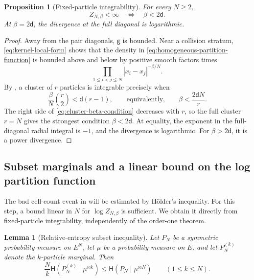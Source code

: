 \documentclass[11pt,reqno]{amsart}
\numberwithin{equation}{section}
\theoremstyle{plain}
\newtheorem{prop}[prop]{Proposition}
\newtheorem{lemma}[lemma]{Lemma}
\theoremstyle{definition}
\renewcommand{\d}{\mathsf d}
\newcommand{\be}{\beta}
\newcommand{\g}{\mathsf g}
\newcommand{\Hr}{\mathsf H}
\begin{document}
\begin{prop}[Fixed-particle integrability]
\label{prop:fixed-particle-integrability}
For every $N\geq2$,
\begin{equation}
 Z_{N,\be}<\infty
 \quad\Longleftrightarrow\quad
 \be<2\d.
 \label{eq:fixed-particle-threshold}
\end{equation}
At $\be=2\d$, the divergence at the full diagonal is logarithmic.
\end{prop}

\begin{proof}
Away from the pair diagonals, $\g$ is bounded.  Near a collision stratum, \eqref{eq:kernel-local-form} shows that the density in \eqref{eq:homogeneous-partition-function} is bounded above and below by positive smooth factors times
\begin{equation}
 \prod_{1\leq i<j\leq N}|x_i-x_j|^{-\be/N}.
 \label{eq:partition-collision-product}
\end{equation}
By , a cluster of $r$ particles is integrable precisely when
\begin{equation}
 \frac{\be}{N}\binom r2<\d(r-1),
 \qquad\text{equivalently,}\qquad
 \be<\frac{2\d N}{r}.
 \label{eq:cluster-beta-condition}
\end{equation}
The right side of \eqref{eq:cluster-beta-condition} decreases with $r$, so the full cluster $r=N$ gives the strongest condition $\be<2\d$.  At equality, the exponent in the full-diagonal radial integral is $-1$, and the divergence is logarithmic.  For $\be>2\d$, it is a power divergence.
\end{proof}

\subsection{Subset marginals and a linear bound on the log partition function}
\label{subsec:linear-safety}

The bad cell-count event in  will be estimated by H\"older's inequality. For this step, a bound linear in $N$ for $\log Z_{N,\be}$ is sufficient. We obtain it directly from fixed-particle integrability, independently of the order-one theorem.

\begin{lemma}[Relative-entropy subset inequality]
\label{lem:relative-entropy-subset}
Let $P_N$ be a symmetric probability measure on $E^N$, let $\mu$ be a probability measure on $E$, and let $P_N^{(k)}$ denote the $k$-particle marginal.  Then
\begin{equation}
 \frac Nk\Hr(P_N^{(k)}\mid\mu^{\otimes k})
 \leq\Hr(P_N\mid\mu^{\otimes N})
 \qquad(1\leq k\leq N).
 \label{eq:relative-entropy-subset}
\end{equation}
\end{lemma}
\end{document}
